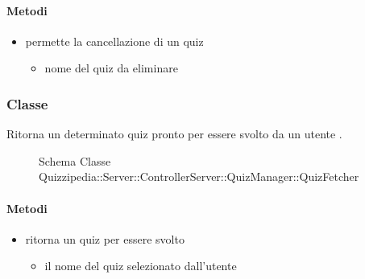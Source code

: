 \paragraph{Metodi}
\begin{itemize}
\item {}
\newline
permette la cancellazione di un quiz
\newline
{}
\newline
\begin{itemize}
\item {}
\newline
nome del quiz da eliminare
\end{itemize}
\end{itemize}
\subsubsection{Classe }
Ritorna un determinato quiz pronto per essere svolto da un utente .
\begin{figure}[H]
\centering
\noindent{}
\caption[Schema Classe QuizFetcher]{Schema Classe Quizzipedia::Server::ControllerServer::QuizManager::QuizFetcher}
\end{figure}
\paragraph{Metodi}
\begin{itemize}
\item {}
\newline
ritorna un quiz per essere svolto
\newline
{}
\newline
\begin{itemize}
\item {}
\newline
il nome del quiz selezionato dall'utente
\end{itemize}
\end{itemize}
